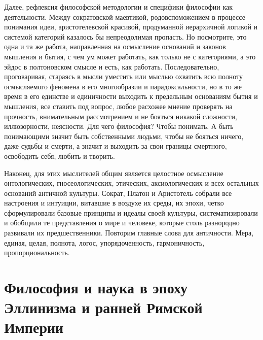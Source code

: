 Далее, рефлексия
философской методологии и специфики философии как деятельности. Между
сократовской маевтикой, родовспоможением в процессе понимания идеи,
аристотелевской красивой, продуманной иерархичной логикой и системой категорий
казалось бы непреодолимая пропасть. Но посмотрите, это одна и та же работа,
направленная на осмысление оснований и законов мышления и бытия, с чем ум может
работать, как только не с категориями, а это эйдос в полтоновском смысле и есть,
как работать. Последовательно, проговаривая, стараясь в мысли уместить или
мыслью охватить всю полноту осмысляемого феномена в его многообразии и
парадоксальности, но в то же время в его единстве и единичности выходить к
предельным основаниям бытия и мышления, все ставить под вопрос, любое расхожее
мнение проверять на прочность, внимательным рассмотрением и не бояться никакой
сложности, иллюзорности, неясности. Для чего философия? Чтобы понимать. А быть
понимающими значит быть собственными людьми, чтобы не бояться ничего, даже
судьбы и смерти, а значит и выходить за свои границы смертного, освободить себя,
любить и творить. 

Наконец, для этих мыслителей общим является целостное
осмысление онтологических, гносеологических, этических, аксиологических и всех
остальных оснований античной культуры. Сократ, Платон и Аристотель собрали все
настроения и интуиции, витавшие в воздухе их среды, их эпохи, четко
сформулировали базовые принципы и идеалы своей культуры, систематизировали и
обобщили те представления о мире и человеке, которые столь разнородно развивали
их предшественники. Повторим главные слова для античности. Мера, единая, целая,
полнота, логос, упорядоченность, гармоничность, пропорциональность. 

\section{Философия и наука в эпоху Эллинизма и ранней Римской Империи}

